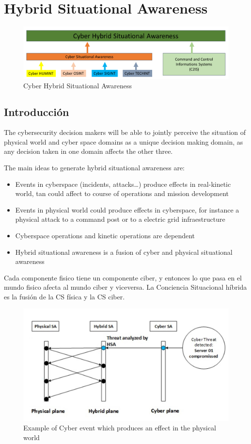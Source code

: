 \chapter{Hybrid Situational Awareness}

\begin{figure}[htbp]
   \centering
   \includegraphics{images/06/CHSA.png}
   \caption{Cyber Hybrid Situational Awareness}
   \label{fig:06/CHSA}
\end{figure}

\section{Introducción}
The cybersecurity decision makers will be able to jointly perceive the situation of physical world
and cyber space domains as a unique decision making domain, as any decision taken in one
domain affects the other three.

The main ideas to generate hybrid situational awareness are:
\begin{itemize}
	\item Events in cyberspace (incidents, attacks…) produce effects in real-kinetic world, tan could affect to
course of operations and mission development
	\item Events in physical world could produce effects in cyberspace, for instance a physical attack to a
command post or to a electric grid infraestructure
	\item Cyberspace operations and kinetic operations are dependent
	\item Hybrid situational awareness is a fusion of cyber and physical situational awareness
\end{itemize}

Cada componente fisico tiene un componente ciber, y entonces lo que pasa en el mundo fisico afecta al mundo ciber y viceversa.
La Conciencia Situacional híbrida es la fusión de la CS física y la CS ciber.

\begin{figure}[htbp]
   \centering
   \includegraphics{images/06/cyberevent.png}
   \caption{Example of Cyber event which produces an effect in the physical world}
   \label{fig:06/cyberevent}
\end{figure}